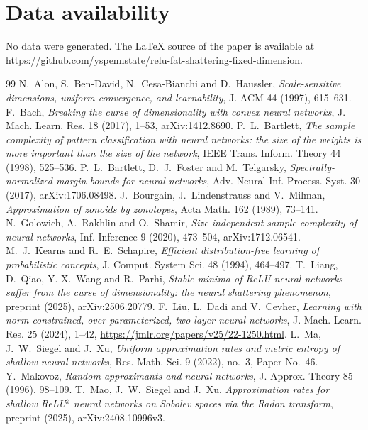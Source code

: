 \documentclass[11pt]{amsart}
\theoremstyle{definition}
\theoremstyle{remark}
\numberwithin{equation}{section}
\begin{document}
\section*{Data availability}
No data were generated. The \LaTeX{} source of the paper is available at \url{https://github.com/yspennstate/relu-fat-shattering-fixed-dimension}.

\appendix


\begin{thebibliography}{99}
 N.~Alon, S.~Ben-David, N.~Cesa-Bianchi and D.~Haussler, \emph{Scale-sensitive dimensions, uniform convergence, and learnability}, J. ACM 44 (1997), 615--631.
 F.~Bach, \emph{Breaking the curse of dimensionality with convex neural networks}, J. Mach. Learn. Res. 18 (2017), 1--53, arXiv:1412.8690.
 P.~L.~Bartlett, \emph{The sample complexity of pattern classification with neural networks: the size of the weights is more important than the size of the network}, IEEE Trans. Inform. Theory 44 (1998), 525--536.
 P.~L.~Bartlett, D.~J.~Foster and M.~Telgarsky, \emph{Spectrally-normalized margin bounds for neural networks}, Adv. Neural Inf. Process. Syst. 30 (2017), arXiv:1706.08498.
 J.~Bourgain, J.~Lindenstrauss and V.~Milman, \emph{Approximation of zonoids by zonotopes}, Acta Math. 162 (1989), 73--141.
 N.~Golowich, A.~Rakhlin and O.~Shamir, \emph{Size-independent sample complexity of neural networks}, Inf. Inference 9 (2020), 473--504, arXiv:1712.06541.
 M.~J.~Kearns and R.~E.~Schapire, \emph{Efficient distribution-free learning of probabilistic concepts}, J. Comput. System Sci. 48 (1994), 464--497.
 T.~Liang, D.~Qiao, Y.-X.~Wang and R.~Parhi, \emph{Stable minima of ReLU neural networks suffer from the curse of dimensionality: the neural shattering phenomenon}, preprint (2025), arXiv:2506.20779.
 F.~Liu, L.~Dadi and V.~Cevher, \emph{Learning with norm constrained, over-parameterized, two-layer neural networks}, J. Mach. Learn. Res. 25 (2024), 1--42, \url{https://jmlr.org/papers/v25/22-1250.html}.
 L.~Ma, J.~W.~Siegel and J.~Xu, \emph{Uniform approximation rates and metric entropy of shallow neural networks}, Res. Math. Sci. 9 (2022), no.~3, Paper No.~46.
 Y.~Makovoz, \emph{Random approximants and neural networks}, J. Approx. Theory 85 (1996), 98--109.
 T.~Mao, J.~W.~Siegel and J.~Xu, \emph{Approximation rates for shallow ReLU$^k$ neural networks on Sobolev spaces via the Radon transform}, preprint (2025), arXiv:2408.10996v3.

\end{thebibliography}
\end{document}
